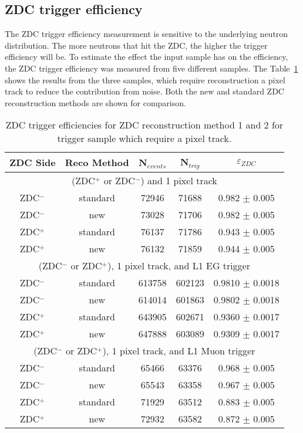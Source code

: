     \subsection{ZDC trigger efficiency}
      The ZDC trigger efficiency measurement is sensitive to the underlying 
        neutron distribution.
      The more neutrons that hit the ZDC, the higher the trigger efficiency 
        will be.
      To estimate the effect the input sample has on the efficiency, the ZDC 
        trigger efficiency was measured from five different samples.
      The Table~\ref{tab:zdcEfficiencySys} shows the results from the 
       three samples, which require reconstruction a pixel track to reduce
       the contribution from noise. 
      Both the new and standard ZDC reconstruction methods are shown for 
        comparison.
      \begin{table}
        \centering
        \begin{tabular}{|c|c|c|c|c|}
          \hline ZDC Side & Reco Method & N$_{events}$ & N$_{trig}$ & $\varepsilon_{ZDC}$ \\ \hline
           \multicolumn{5}{|c|}{(ZDC$^{+}$ or ZDC$^{-}$) and 1 pixel track} \\ \hline 
           ZDC$^{-}$ & standard & 72946  & 71688 & 0.982 $\pm$ 0.005 \\ \hline
           ZDC$^{-}$ & new & 73028  & 71706  & 0.982  $\pm$ 0.005  \\ \hline
           ZDC$^{+}$ & standard & 76137  & 71786  & 0.943  $\pm$ 0.005  \\ \hline
           ZDC$^{+}$ & new & 76132  & 71859  & 0.944  $\pm$ 0.005  \\ \hline
           \multicolumn{5}{|c|}{(ZDC$^{-}$ or ZDC$^{+}$), 1 pixel track, and L1 EG trigger } \\ \hline 
           ZDC$^{-}$ & standard & 613758  & 602123  & 0.9810 $\pm$ 0.0018 \\ \hline
           ZDC$^{-}$ & new & 614014  & 601863  & 0.9802 $\pm$ 0.0018 \\ \hline
           ZDC$^{+}$ & standard & 643905  & 602671  & 0.9360  $\pm$ 0.0017 \\ \hline
           ZDC$^{+}$ & new & 647888  & 603089  & 0.9309  $\pm$ 0.0017 \\ \hline
           \multicolumn{5}{|c|}{(ZDC$^{-}$ or ZDC$^{+}$), 1 pixel track, and L1 Muon trigger} \\ \hline 
           ZDC$^{-}$ & standard & 65466  & 63376  & 0.968 $\pm$ 0.005  \\ \hline
           ZDC$^{-}$ & new & 65543  & 63358  & 0.967 $\pm$ 0.005 \\ \hline
           ZDC$^{+}$ & standard & 71929  & 63512  & 0.883  $\pm$ 0.005 \\ \hline
           ZDC$^{+}$ & new & 72932  & 63582  & 0.872  $\pm$ 0.005 \\ \hline
         \end{tabular}
        \caption{ZDC trigger efficiencies for ZDC reconstruction method 1 and 
          2 for trigger sample which require a pixel track.}
        \label{tab:zdcEfficiencySys}
      \end{table}
      
